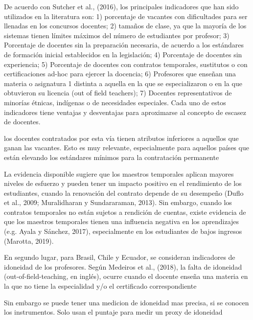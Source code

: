 De acuerdo con Sutcher et al., (2016), los principales indicadores que han sido utilizados en la literatura son: 1) porcentaje de vacantes con dificultades para ser llenadas en los concursos docentes; 2) tamaños de clase, ya que la mayoría de los sistemas tienen límites máximos del número de estudiantes por profesor; 3) Porcentaje de docentes sin la preparación necesaria, de acuerdo a los estándares de formación inicial establecidos en la legislación; 4) Porcentaje de docentes sin experiencia; 5) Porcentaje de docentes con contratos temporales, sustitutos o con certificaciones ad-hoc para ejercer la docencia; 6) Profesores que enseñan una materia o asignatura 1 distinta a aquella en la que se especializaron o en la que obtuvieron su licencia (out of field teachers); 7) Docentes representativos de minorías étnicas, indígenas o de necesidades especiales. Cada uno de estos indicadores tiene ventajas y desventajas para aproximarse al concepto de escasez de docentes.


los docentes contratados por esta vía tienen atributos inferiores a aquellos que ganan las vacantes. Esto es muy relevante, especialmente para aquellos países que están elevando los estándares mínimos para la contratación permanente

La evidencia disponible sugiere que los maestros temporales aplican mayores niveles de esfuerzo y pueden tener un impacto positivo en el rendimiento de los estudiantes, cuando la renovación del contrato depende de su desempeño (Duflo et al., 2009; Muralidharan y Sundararaman, 2013). Sin embargo, cuando los contratos temporales no están sujetos a rendición de cuentas, existe evidencia de que los maestros temporales tienen una influencia negativa en los aprendizajes (e.g. Ayala y Sánchez, 2017), especialmente en los estudiantes de bajos ingresos (Marotta, 2019).


En segundo lugar, para Brasil, Chile y Ecuador, se consideran indicadores de idoneidad de los profesores. Según Medeiros et al., (2018), la falta de idoneidad (out-of-field-teaching, en inglés), ocurre cuando el docente enseña una materia en la que no tiene la especialidad y/o el certificado correspondiente

Sin embargo se puede tener una medicion de idoneidad mas precisa, si se conocen los instrumentos. Solo usan el puntaje para medir un proxy de idoneidad


